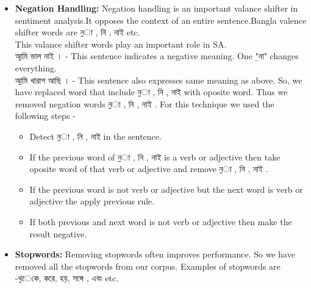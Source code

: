 \documentclass[a4paper,12pt]{report}
\begin{document}
\begin{itemize}
    \item \textbf{Negation Handling: }Negation handling is an important valance shifter in sentiment analysis.It opposes the context of an entire sentence.Bangla valence shifter words are {\b না , নি , নাই } etc. \\
   This valance shifter words play an important role in SA.\\{\b আমি ভাল নাই । - } This sentence indicates a negative meaning. One {\b "না"} changes everything. \\
   {\b আমি খারাপ আছি । -} This sentence also expresses same meaning as above.
   So, we have replaced word that include  {\b না , নি , নাই } with oposite word. Thus we removed negation words  {\b না , নি , নাই }. For this technique we used the following steps -
   \\
  \begin{itemize}
  \item Detect {\b না , নি , নাই } in the sentence.
  \item If the previous word of {\b না , নি , নাই } is a verb or adjective then take oposite word of that verb or adjective and remove {\b না , নি , নাই } .
  \item If the previous word is not verb or adjective but the next word is verb or adjective the apply previous rule.
  \item If both previous and next word is not verb or adjective then make the result negative.
  \end{itemize}

    \item \textbf{Stopwords: }Removing stopwords often improves performance. So we have removed all the stopwords from our corpus. Examples of stopwords are -{\b থেকে, করে, হয়, সঙ্গে , এবং} etc. 

\end{itemize}
\end{document}
